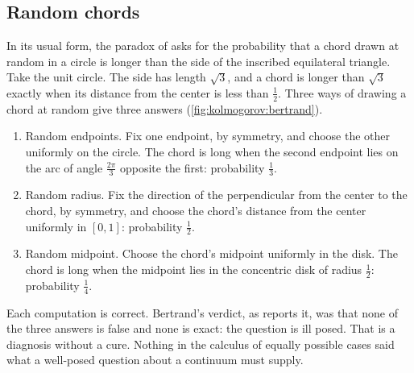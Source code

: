 \begin{refsection}
\subsection{Random chords}\label{sec:kolmogorov:chords}

In its usual form, the paradox of \textcite{Bertrand1889} asks for the probability that a chord drawn at random in a circle is longer than the side of the inscribed equilateral triangle. Take the unit circle. The side has length $\sqrt3$, and a chord is longer than $\sqrt3$ exactly when its distance from the center is less than $\frac12$. Three ways of drawing a chord at random give three answers (\cref{fig:kolmogorov:bertrand}).
\begin{enumerate}
\item Random endpoints. Fix one endpoint, by symmetry, and choose the other uniformly on the circle. The chord is long when the second endpoint lies on the arc of angle $\frac{2\pi}3$ opposite the first: probability $\frac13$.
\item Random radius. Fix the direction of the perpendicular from the center to the chord, by symmetry, and choose the chord's distance from the center uniformly in $[0,1]$: probability $\frac12$.
\item Random midpoint. Choose the chord's midpoint uniformly in the disk. The chord is long when the midpoint lies in the concentric disk of radius $\frac12$: probability $\frac14$.
\end{enumerate}
Each computation is correct. Bertrand's verdict, as \textcite{Jaynes1973} reports it, was that none of the three answers is false and none is exact: the question is ill posed. That is a diagnosis without a cure. Nothing in the calculus of equally possible cases said what a well-posed question about a continuum must supply.


\end{refsection}
